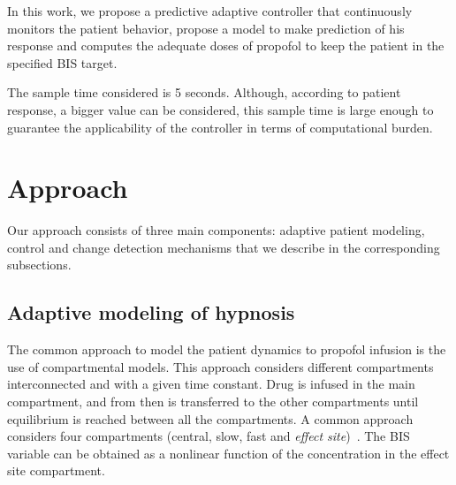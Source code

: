 In this work, we propose a predictive adaptive controller that
continuously monitors the patient behavior, propose a model to make
prediction of his response and computes the adequate doses of propofol
to keep the patient in the specified BIS target.

The sample time considered is 5 seconds. Although, according to
patient response, a bigger value can be considered, this sample time
is large enough to guarantee the applicability of the controller in
terms of computational burden.

\section{Approach}
Our approach consists of three main components: adaptive patient
modeling, control and change detection mechanisms that we describe in
the corresponding subsections.

\subsection{Adaptive modeling of hypnosis}
The common approach to model the patient dynamics to propofol infusion
is the use of compartmental models. %
This approach considers different compartments interconnected and with
a given time constant. Drug is infused in the main compartment, and
from then is transferred to the other compartments until equilibrium
is reached between all the compartments. A common approach considers
four compartments (central, slow, fast and \textit{effect
  site})~\cite{schnider_influence_1998}.
%
The BIS variable can be obtained as a nonlinear function of the
concentration in the effect site compartment.

